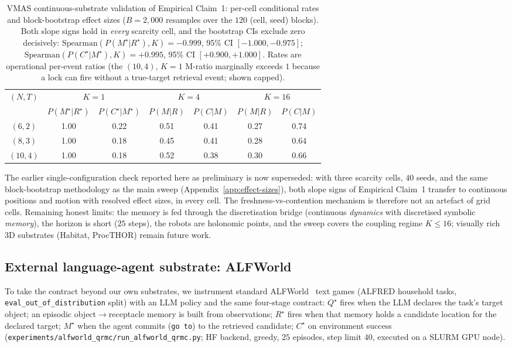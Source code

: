 \documentclass{article}
\newcommand{\method}[1]{\texttt{#1}}
\begin{document}
\begin{table}[h]
\caption{VMAS continuous-substrate validation of Empirical Claim~1: per-cell conditional rates and block-bootstrap effect sizes ($B{=}2{,}000$ resamples over the $120$ (cell, seed) blocks). Both slope signs hold in \emph{every} scarcity cell, and the bootstrap CIs exclude zero decisively: $\mathrm{Spearman}(P(M^\star|R^\star),K) = -0.999$, 95\% CI $[-1.000,-0.975]$; $\mathrm{Spearman}(P(C^\star|M^\star),K) = +0.995$, 95\% CI $[+0.900,+1.000]$. Rates are operational per-event ratios (the $(10,4)$, $K{=}1$ M-ratio marginally exceeds $1$ because a lock can fire without a true-target retrieval event; shown capped).}
\label{tab:vmas}
\centering
\small
\begin{tabular}{c c c c c c c}
\toprule
$(N,T)$ & \multicolumn{2}{c}{$K{=}1$} & \multicolumn{2}{c}{$K{=}4$} & \multicolumn{2}{c}{$K{=}16$} \\
 & $P(M^\star|R^\star)$ & $P(C^\star|M^\star)$ & $P(M|R)$ & $P(C|M)$ & $P(M|R)$ & $P(C|M)$ \\
\midrule
$(6,2)$  & 1.00 & 0.22 & 0.51 & 0.41 & 0.27 & 0.74 \\
$(8,3)$  & 1.00 & 0.18 & 0.45 & 0.41 & 0.28 & 0.64 \\
$(10,4)$ & 1.00 & 0.18 & 0.52 & 0.38 & 0.30 & 0.66 \\
\bottomrule
\end{tabular}
\end{table}

The earlier single-configuration check reported here as preliminary is now
superseded: with three scarcity cells, $40$ seeds, and the same block-bootstrap
methodology as the main sweep (Appendix~\ref{app:effect-sizes}), both slope
signs of Empirical Claim~1 transfer to continuous positions and motion with
resolved effect sizes, in every cell. The freshness-vs-contention mechanism is
therefore not an artefact of grid cells. Remaining honest limits: the memory is
fed through the discretisation bridge (continuous \emph{dynamics} with
discretised symbolic \emph{memory}), the horizon is short ($25$ steps), the
robots are holonomic points, and the sweep covers the coupling regime
$K\le16$; visually rich 3D substrates (Habitat, ProcTHOR) remain future work.

\subsection{External language-agent substrate: ALFWorld}
\label{app:alfworld}

To take the contract beyond our own substrates, we instrument standard
ALFWorld~\citep{shridhar2021alfworld} text games (ALFRED household tasks,
\texttt{eval\_out\_of\_distribution} split) with an LLM policy and the same
four-stage contract: $Q^\star$ fires when the LLM declares the task's target
object; an episodic object$\to$receptacle memory is built from observations;
$R^\star$ fires when that memory holds a candidate location for the declared
target; $M^\star$ when the agent commits (\texttt{go to}) to the retrieved
candidate; $C^\star$ on environment success
(\method{experiments/alfworld\_qrmc/run\_alfworld\_qrmc.py}; HF backend, greedy,
$25$ episodes, step limit $40$, executed on a SLURM GPU node).
\end{document}
